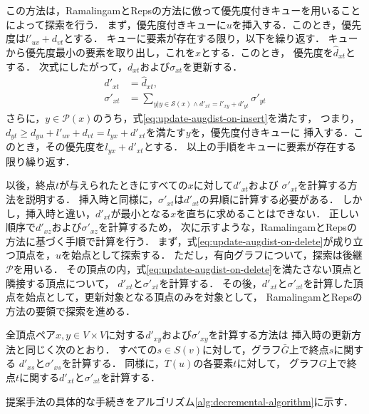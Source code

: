 この方法は，RamalingamとRepsの方法に倣って優先度付きキューを用いることによって探索を行う．
まず，優先度付きキューに$u$を挿入する．このとき，優先度は$l'_{uv}+d_{vt}$とする．
キューに要素が存在する限り，以下を繰り返す．
キューから優先度最小の要素を取り出し，これを$x$とする．このとき，
優先度を$\hat{d}_{xt}$とする．
次式にしたがって，$d_{xt}$および$\sigma_{xt}$を更新する．
\begin{equation*}
  \begin{aligned}
    d'_{xt}&=\hat{d}_{xt},\\
    \sigma'_{xt}&=\sum_{y|y\in\mathcal{S}(x)\land d'_{xt}=l'_{xy}+d'_{yt}}\sigma'_{yt}
  \end{aligned}
\end{equation*}
さらに，$y\in\mathcal{P}(x)$のうち，式\eqref{eq:update-augdist-on-insert}を満たす，
つまり，$d_{yt}\geq d_{yu}+l'_{uv}+d_{vt}=l_{yx}+d'_{xt}$を満たす$y$を，優先度付きキューに
挿入する．このとき，その優先度を$l_{yx}+d'_{xt}$とする．
以上の手順をキューに要素が存在する限り繰り返す．

以後，終点$t$が与えられたときにすべての$x$に対して$d'_{xt}$および
$\sigma'_{xt}$を計算する方法を説明する．
挿入時と同様に，$\sigma'_{xt}$は$d'_{xt}$の昇順に計算する必要がある．
しかし，挿入時と違い，$d'_{xt}$が最小となる$x$を直ちに求めることはできない．
正しい順序で$d'_{xz}$および$\sigma'_{xz}$を計算するため，
次に示すような，RamalingamとRepsの方法に基づく手順で計算を行う．
まず，式\eqref{eq:update-augdist-on-delete}が成り立つ頂点を，$u$を始点として探索する．
ただし，有向グラフについて，探索は後継$\mathcal{P}$を用いる．
その頂点の内，式\eqref{eq:update-augdist-on-delete}を満たさない頂点と隣接する頂点について，
$d'_{xt}$と$\sigma'_{xt}$を計算する．
その後，$d'_{xt}$と$\sigma'_{xt}$を計算した頂点を始点として，更新対象となる頂点のみを対象として，
RamalingamとRepsの方法の要領で探索を進める．

全頂点ペア$x,y\in V\times V$に対する$d'_{xy}$および$\sigma'_{xy}$を計算する方法は
挿入時の更新方法と同じく次のとおり．
すべての$s\in S(v)$に対して，グラフ$\bar{G}$上で終点$s$に関する
$d'_{xs}$と$\sigma'_{xs}$を計算する．
同様に，$T(u)$の各要素$t$に対して，
グラフ$G$上で終点$t$に関する$d'_{xt}$と$\sigma'_{xt}$を計算する．

提案手法の具体的な手続きをアルゴリズム\ref{alg:decremental-algorithm}に示す．

